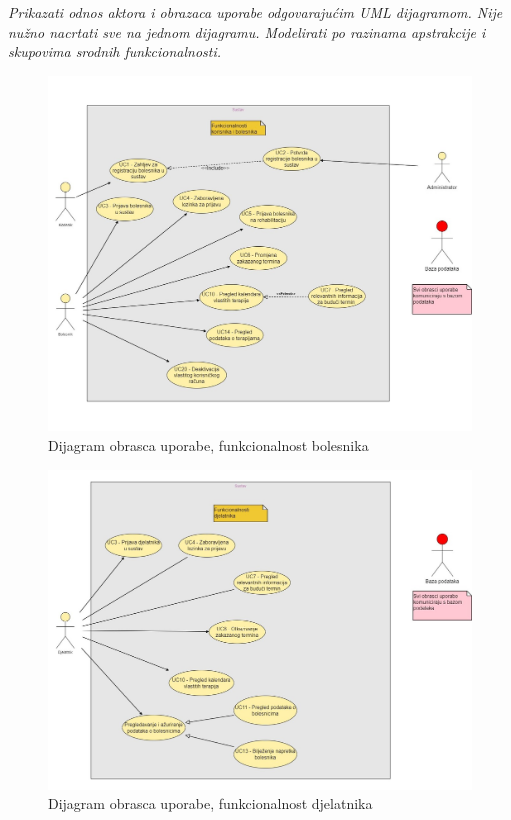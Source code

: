 \textit{Prikazati odnos aktora i obrazaca uporabe odgovarajućim UML dijagramom. Nije nužno nacrtati sve na jednom dijagramu. Modelirati po razinama apstrakcije i skupovima srodnih funkcionalnosti.}
\begin{figure}[h]
    \centering
    \includegraphics[width=\textwidth]{./slike/UC Dijagram - Bolesnik} 
    \caption{Dijagram obrasca uporabe, funkcionalnost bolesnika}
    \label{fig:my_image}
\end{figure}
\begin{figure}[p]
    \centering
    \includegraphics[width=\textwidth]{./slike/UC Dijagram - Djelatnik} 
    \caption{Dijagram obrasca uporabe, funkcionalnost djelatnika}
    \label{fig:my_image}
\end{figure}

